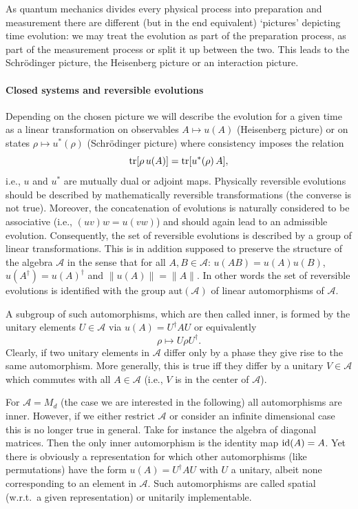 \documentclass[11pt,a4paper]{article}
\theoremstyle{plain}
\theoremstyle{definition}
\theoremstyle{remark}
\numberwithin{equation}{section}
\begin{document}
As quantum mechanics divides every physical process into preparation and measurement there are different (but in the end equivalent) `pictures' depicting time evolution: we may treat the evolution as part of the preparation process, as part of the measurement process or split it up between the two. This leads to the Schr\"odinger picture, the Heisenberg picture or an interaction picture.

\paragraph{Closed systems and reversible evolutions}
Depending on the chosen picture we will describe the evolution for a given time as a linear transformation on observables $A\mapsto u(A)$ (Heisenberg picture) or on states $\rho\mapsto u^\ast(\rho)$ (Schr\"odinger picture) where consistency imposes the relation
\begin{equation}
    \operatorname{tr}[\rho\,u(A)] = \operatorname{tr}[u^\ast(\rho)\,A] ,
\end{equation}
i.e., $u$ and $u^\ast$ are mutually dual or adjoint maps. Physically reversible evolutions should be described by mathematically reversible transformations (the converse is not true). Moreover, the concatenation of evolutions is naturally considered to be associative (i.e., $(uv)w=u(vw)$) and should again lead to an admissible evolution. Consequently, the set of reversible evolutions is described by a group of linear transformations. This is in addition supposed to preserve the structure of the algebra $\mathcal{A}$ in the sense that for all $A,B\in \mathcal{A}$: $u(AB)=u(A)u(B)$, $u(A^\dagger)=u(A)^\dagger$ and $\|u(A)\|=\|A\|$. In other words the set of reversible evolutions is identified with the group $\mathrm{aut}(\mathcal{A})$ of linear automorphisms of $\mathcal{A}$.

A subgroup of such automorphisms, which are then called inner, is formed by the unitary elements $U\in \mathcal{A}$ via $u(A)=U^\dagger A U$ or equivalently
\begin{equation}
    \rho \mapsto U\rho U^\dagger.
\end{equation}
Clearly, if two unitary elements in $\mathcal{A}$ differ only by a phase they give rise to the same automorphism. More generally, this is true iff they differ by a unitary $V\in \mathcal{A}$ which commutes with all $A\in \mathcal{A}$ (i.e., $V$ is in the center of $\mathcal{A}$).

For $\mathcal{A}=M_d$ (the case we are interested in the following) all automorphisms are inner. However, if we either restrict $\mathcal{A}$ or consider an infinite dimensional case this is no longer true in general. Take for instance the algebra of diagonal matrices. Then the only inner automorphism is the identity map $\mathrm{id}(A)=A$. Yet there is obviously a representation for which other automorphisms (like permutations) have the form $u(A)=U^\dagger A U$ with $U$ a unitary, albeit none corresponding to an element in $\mathcal{A}$. Such automorphisms are called spatial (w.r.t.\ a given representation) or unitarily implementable.
\end{document}
